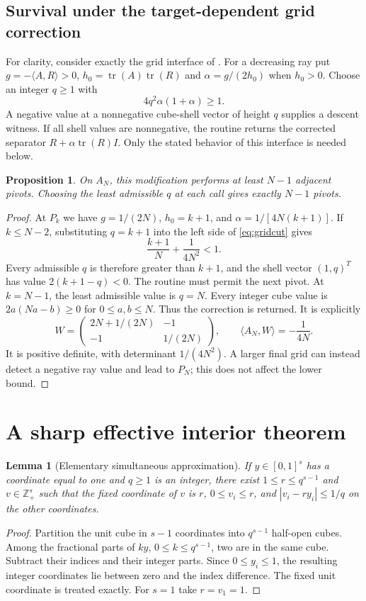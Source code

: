\documentclass[11pt]{article}
\newtheorem{lemma}[theorem]{Lemma}
\newtheorem{proposition}[theorem]{Proposition}
\theoremstyle{remark}\newtheorem{remark}[theorem]{Remark}
\newcommand{\tr}{\operatorname{tr}}
\newcommand{\ip}[2]{\langle #1,#2\rangle}
\begin{document}
\subsection{Survival under the target-dependent grid correction}
For clarity, consider exactly the grid interface of \cite{M37}. For a decreasing ray put $g=-\ip AR>0$, $h_0=\tr(A)\tr(R)$ and $\alpha=g/(2h_0)$ when $h_0>0$. Choose an integer $q\ge1$ with
\begin{equation}\label{eq:gridcut}
 4q^2\alpha(1+\alpha)\ge1.
\end{equation}
A negative value at a nonnegative cube-shell vector of height $q$ supplies a descent witness. If all shell values are nonnegative, the routine returns the corrected separator $R+\alpha\tr(R)I$. Only the stated behavior of this interface is needed below.

\begin{proposition}\label{prop:grid}
On $A_N$, this modification performs at least $N-1$ adjacent pivots. Choosing the least admissible $q$ at each call gives exactly $N-1$ pivots.
\end{proposition}
\begin{proof}
At $P_k$ we have $g=1/(2N)$, $h_0=k+1$, and $\alpha=1/[4N(k+1)]$. If $k\le N-2$, substituting $q=k+1$ into the left side of \eqref{eq:gridcut} gives
\[
 \frac{k+1}{N}+\frac1{4N^2}<1.
\]
Every admissible $q$ is therefore greater than $k+1$, and the shell vector $(1,q)^T$ has value $2(k+1-q)<0$. The routine must permit the next pivot. At $k=N-1$, the least admissible value is $q=N$. Every integer cube value is $2a(Na-b)\ge0$ for $0\le a,b\le N$. Thus the correction is returned. It is explicitly
\[
 W=\begin{pmatrix}2N+1/(2N)&-1\\-1&1/(2N)\end{pmatrix},
 \qquad \ip{A_N}{W}=-\frac1{4N}.
\]
It is positive definite, with determinant $1/(4N^2)$. A larger final grid can instead detect a negative ray value and lead to $P_N$; this does not affect the lower bound.
\end{proof}

\section{A sharp effective interior theorem}\label{sec:IR}
\begin{lemma}[Elementary simultaneous approximation]\label{lem:dirichlet}
If $y\in[0,1]^s$ has a coordinate equal to one and $q\ge1$ is an integer, there exist $1\le r\le q^{s-1}$ and $v\in\mathbb Z_+^s$ such that the fixed coordinate of $v$ is $r$, $0\le v_i\le r$, and $|v_i-r y_i|\le1/q$ on the other coordinates.
\end{lemma}
\begin{proof}
Partition the unit cube in $s-1$ coordinates into $q^{s-1}$ half-open cubes. Among the fractional parts of $k y$, $0\le k\le q^{s-1}$, two are in the same cube. Subtract their indices and their integer parts. Since $0\le y_i\le1$, the resulting integer coordinates lie between zero and the index difference. The fixed unit coordinate is treated exactly. For $s=1$ take $r=v_1=1$.
\end{proof}
\end{document}
